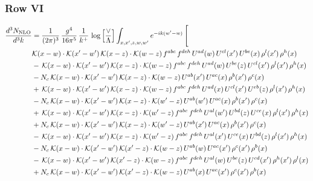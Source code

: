 \documentclass[9pt]{article}
\numberwithin{equation}{section}
\begin{document}
\subsubsection{Row VI}
\begin{align}
\frac{d^{3}N_{\mathrm{NLO}}}{d^{3}k} & = \frac{1}{(2\pi)^{3}}\,\frac{g^{4}}{16\pi^{5}}\,\frac{1}{k^{+}}\,\log\Big[\frac{\vee}{\Lambda}\Big]\int_{x,x',z,w,w'}e^{-ik(w'-w)}\,\Bigg[\notag\\ & \mathcal{K}(x-w)\cdot\mathcal{K}(x'-w')\,\mathcal{K}(x-z)\cdot\mathcal{K}(w-z)\,f^{abc}\,f^{deh}\,U^{ad}(w)\,U^{cl}(x')\,U^{be}(x)\,\rho^{l}(x')\,\rho^{h}(x)\notag\\
& -\,\mathcal{K}(x-w)\cdot\mathcal{K}(x'-w')\,\mathcal{K}(x-z)\cdot\mathcal{K}(w-z)\,f^{abc}\,f^{deh}\,U^{ad}(w)\,U^{be}(z)\,U^{cl}(x')\,\rho^{l}(x')\,\rho^{h}(x)\notag\\
& -N_{c}\,\mathcal{K}(x-w)\cdot\mathcal{K}(x'-w')\,\mathcal{K}(x-z)\cdot\mathcal{K}(w-z)\,U^{ab}(x')\,U^{ac}(x)\,\rho^{b}(x')\,\rho^{c}(x)\notag\\
& +\,\mathcal{K}(x-w)\cdot\mathcal{K}(x'-w')\,\mathcal{K}(x-z)\cdot\mathcal{K}(w-z)\,f^{abc}\,f^{deh}\,U^{ad}(x)\,U^{cl}(x')\,U^{eb}(z)\,\rho^{l}(x')\,\rho^{h}(x)\notag\\
& -N_{c}\,\mathcal{K}(x-w)\cdot\mathcal{K}(x'-w')\,\mathcal{K}(x-z)\cdot\mathcal{K}(w'-z)\,U^{ab}(w')\,U^{ac}(x)\,\rho^{b}(x')\,\rho^{c}(x)\notag\\
& +\,\mathcal{K}(x-w)\cdot\mathcal{K}(x'-w')\,\mathcal{K}(x-z)\cdot\mathcal{K}(w'-z)\,f^{abc}\,f^{deh}\,U^{al}(w')\,U^{bd}(z)\,U^{ce}(x)\,\rho^{l}(x')\,\rho^{h}(x)\notag\\
& +N_{c}\,\mathcal{K}(x-w)\cdot\mathcal{K}(x'-w')\,\mathcal{K}(x-z)\cdot\mathcal{K}(w'-z)\,U^{ab}(x')\,U^{ac}(x)\,\rho^{b}(x')\,\rho^{c}(x)\notag\\
& -\,\mathcal{K}(x-w)\cdot\mathcal{K}(x'-w')\,\mathcal{K}(x-z)\cdot\mathcal{K}(w'-z)\,f^{abc}\,f^{deh}\,U^{al}(x')\,U^{ce}(x)\,U^{bd}(z)\,\rho^{l}(x')\,\rho^{h}(x)\notag\\
& -N_{c}\,\mathcal{K}(x-w)\cdot\mathcal{K}(x'-w')\,\mathcal{K}(x'-z)\cdot\mathcal{K}(w-z)\,U^{ab}(w)\,U^{ac}(x')\,\rho^{c}(x')\,\rho^{b}(x)\notag\\
& -\,\mathcal{K}(x-w)\cdot\mathcal{K}(x'-w')\,\mathcal{K}(x'-z)\cdot\mathcal{K}(w-z)\,f^{abc}\,f^{deh}\,U^{al}(w)\,U^{be}(z)\,U^{cd}(x')\,\rho^{h}(x')\,\rho^{l}(x)\notag\\
& +N_{c}\,\mathcal{K}(x-w)\cdot\mathcal{K}(x'-w')\,\mathcal{K}(x'-z)\cdot\mathcal{K}(w-z)\,U^{ab}(x)\,U^{ac}(x')\,\rho^{c}(x')\,\rho^{b}(x)\notag\\

\end{align}
\end{document}

